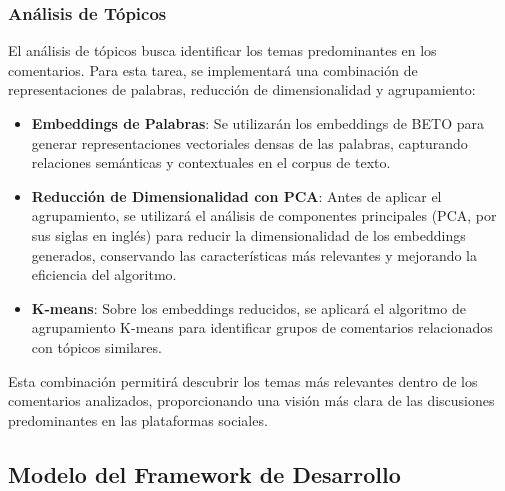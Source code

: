 \documentclass[10pt, a4paper]{article}
\begin{document}
	
	
	\subsubsection{Análisis de Tópicos}
	
	El análisis de tópicos busca identificar los temas predominantes en los comentarios. Para esta tarea, se implementará una combinación de representaciones de palabras, reducción de dimensionalidad y agrupamiento:
	
	\begin{itemize}
		\item \textbf{Embeddings de Palabras}: Se utilizarán los embeddings de BETO para generar representaciones vectoriales densas de las palabras, capturando relaciones semánticas y contextuales en el corpus de texto.
		\item \textbf{Reducción de Dimensionalidad con PCA}: Antes de aplicar el agrupamiento, se utilizará el análisis de componentes principales (PCA, por sus siglas en inglés) para reducir la dimensionalidad de los embeddings generados, conservando las características más relevantes y mejorando la eficiencia del algoritmo.
		\item \textbf{K-means}: Sobre los embeddings reducidos, se aplicará el algoritmo de agrupamiento K-means para identificar grupos de comentarios relacionados con tópicos similares.
	\end{itemize}
	
	Esta combinación permitirá descubrir los temas más relevantes dentro de los comentarios analizados, proporcionando una visión más clara de las discusiones predominantes en las plataformas sociales.
	
	\subsection{Modelo del Framework de Desarrollo}
	
\end{document}
